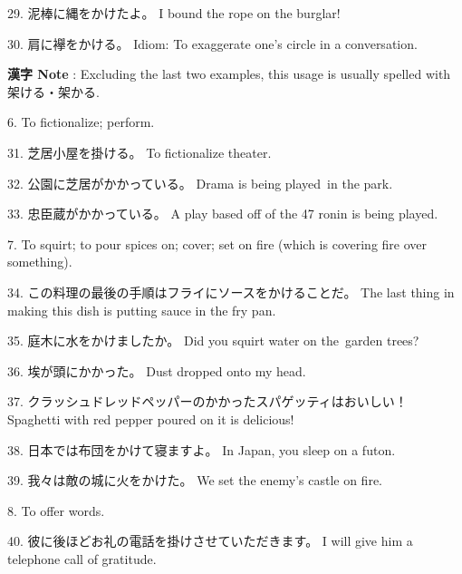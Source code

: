 \par{29. 泥棒に縄をかけたよ。 \hfill\break
I bound the rope on the burglar! }

\par{30. 肩に襷をかける。 \hfill\break
Idiom: To exaggerate one's circle in a conversation. }

\par{\textbf{漢字 Note }: Excluding the last two examples, this usage is usually spelled with 架ける・架かる. }

\par{6. To fictionalize; perform. }

\par{31. 芝居小屋を掛ける。 \hfill\break
To fictionalize theater. }

\par{32. 公園に芝居がかかっている。 \hfill\break
Drama is being played in the park. }

\par{33. 忠臣蔵がかかっている。 \hfill\break
A play based off of the 47 ronin is being played. }

\par{7. To squirt; to pour spices on; cover; set on fire (which is covering fire over something). }

\par{34. この料理の最後の手順はフライにソースをかけることだ。 \hfill\break
The last thing in making this dish is putting sauce in the fry pan. }

\par{35. 庭木に水をかけましたか。 \hfill\break
Did you squirt water on the garden trees? }

\par{36. 埃が頭にかかった。 \hfill\break
Dust dropped onto my head. }

\par{37. クラッシュドレッドペッパーのかかったスパゲッティはおいしい！ \hfill\break
Spaghetti with red pepper poured on it is delicious! }

\par{38. 日本では布団をかけて寝ますよ。 \hfill\break
In Japan, you sleep on a futon. }

\par{39. 我々は敵の城に火をかけた。 \hfill\break
We set the enemy's castle on fire. }

\par{8. To offer words. }

\par{40. 彼に後ほどお礼の電話を掛けさせていただきます。 \hfill\break
I will give him a telephone call of gratitude. }

